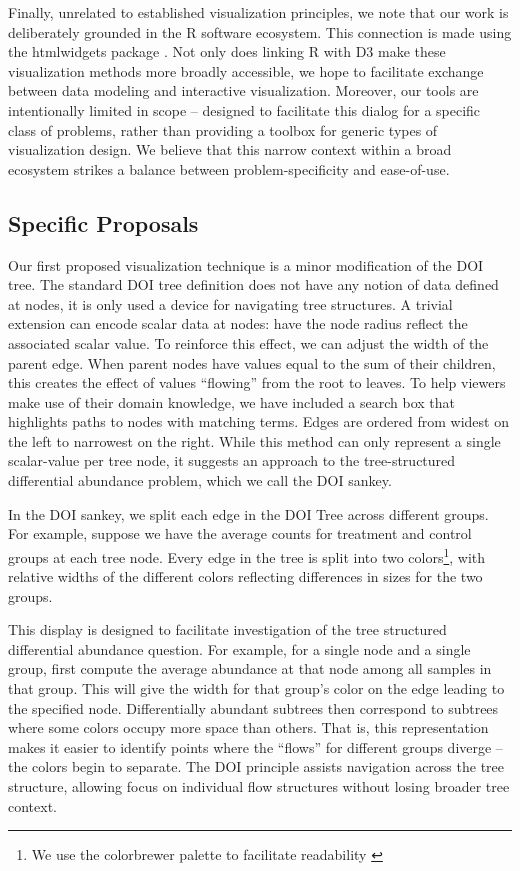 \documentclass[12pt]{article}
\begin{document}
Finally, unrelated to established visualization principles, we note that our
work is deliberately grounded in the R software ecosystem. This connection is
made using the htmlwidgets package \citep{vaidyanathan2014htmlwidgets}. Not only
does linking R with D3 make these visualization methods more broadly accessible,
we hope to facilitate exchange between data modeling and interactive
visualization. Moreover, our tools are intentionally limited in scope --
designed to facilitate this dialog for a specific class of problems, rather than
providing a toolbox for generic types of visualization design. We believe that
this narrow context within a broad ecosystem strikes a balance between
problem-specificity and ease-of-use.

\subsection{Specific Proposals}\label{specific-proposals}

Our first proposed visualization technique is a minor modification of the DOI
tree. The standard DOI tree definition does not have any notion of data defined
at nodes, it is only used a device for navigating tree structures. A trivial
extension can encode scalar data at nodes: have the node radius reflect the
associated scalar value. To reinforce this effect, we can adjust the width of
the parent edge. When parent nodes have values equal to the sum of their
children, this creates the effect of values ``flowing'' from the root to leaves.
To help viewers make use of their domain knowledge, we have included a search
box that highlights paths to nodes with matching terms. Edges are ordered from
widest on the left to narrowest on the right. While this method can only
represent a single scalar-value per tree node, it suggests an approach to the
tree-structured differential abundance problem, which we call the DOI sankey.

In the DOI sankey, we split each edge in the DOI Tree across different groups.
For example, suppose we have the average counts for treatment and control groups
at each tree node. Every edge in the tree is split into two colors\footnote{We
  use the colorbrewer palette to facilitate readability
  \citep{brewer2003colorbrewer}}, with relative widths of the different colors
reflecting differences in sizes for the two groups.

This display is designed to facilitate investigation of the tree structured
differential abundance question. For example, for a single node and a single
group, first compute the average abundance at that node among all samples in
that group. This will give the width for that group's color on the edge leading
to the specified node. Differentially abundant subtrees then correspond to
subtrees where some colors occupy more space than others. That is, this
representation makes it easier to identify points where the ``flows'' for
different groups diverge -- the colors begin to separate. The DOI principle
assists navigation across the tree structure, allowing focus on individual flow
structures without losing broader tree context.
\end{document}

